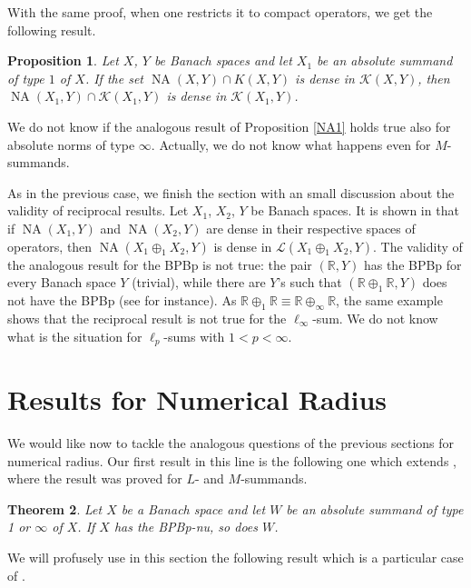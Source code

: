 \documentclass[10pt,a4paper]{amsart}
\theoremstyle{plain}
\newtheorem{theorem}{Theorem}[section]
\newtheorem{prop}[theorem]{Proposition}
\theoremstyle{definition}
\newcommand{\R}{\mathbb{R}}
\DeclareMathOperator{\NA}{NA}
\begin{document}
With the same proof, when one restricts it to compact operators, we get the following result.

\begin{prop} \label{KNA-domain} Let $X$, $Y$ be Banach spaces and let $X_1$ be an absolute summand of type $1$ of $X$. If the set $\NA(X, Y) \cap K(X, Y)$ is dense in $\mathcal{K}(X, Y)$, then $\NA(X_1, Y) \cap \mathcal{K}(X_1, Y)$ is dense in $\mathcal{K}(X_1, Y)$.	
\end{prop}

We do not know if the analogous result of Proposition \ref{NA1} holds true also for absolute norms of type $\infty$. Actually, we do not know what happens even for $M$-summands.

As in the previous case, we finish the section with an small discussion about the validity of reciprocal results. Let $X_1$, $X_2$, $Y$ be Banach spaces. It is shown in \cite[Lemma 2]{PS} that if $\NA(X_1,Y)$ and $\NA(X_2,Y)$ are dense in their respective spaces of operators, then $\NA(X_1\oplus_1 X_2,Y)$ is dense in $\mathcal{L}(X_1\oplus_1 X_2,Y)$. The validity of the analogous result for the BPBp is not true: the pair $(\R,Y)$ has the BPBp for every Banach space $Y$ (trivial), while there are $Y$'s such that $(\R\oplus_1 \R,Y)$ does not have the BPBp (see \cite[Corollary 3.3]{ACKLM} for instance). As $\R\oplus_1\R \equiv \R\oplus_\infty \R$, the same example shows that the reciprocal result is not true for the $\ell_\infty$-sum. We do not know what is the situation for $\ell_p$-sums with $1<p<\infty$.

\section{Results for Numerical Radius} \label{numericalradius}

We would like now to tackle the analogous questions of the previous sections for numerical radius. Our first result in this line is the following one which extends \cite[Lemma 19]{KLM1}, where the result was proved for $L$- and $M$-summands.

\begin{theorem} \label{numericalradius1} Let $X$ be a Banach space and let $W$ be an absolute summand of type 1 or $\infty$ of $X$. If $X$ has the BPBp-nu, so does $W$.	
\end{theorem}


We will profusely use in this section the following result which is a particular case of  \cite[Lemma 3.3]{CMM}.
\end{document}
